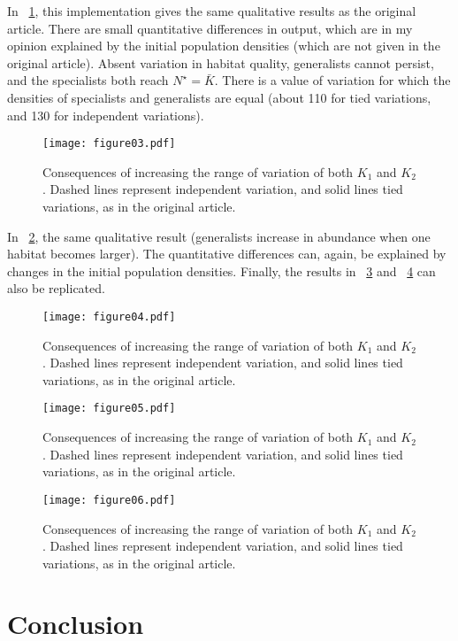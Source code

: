 \documentclass[10pt,a4paper,onecolumn]{article}
\renewcommand{\includegraphics}[2][]{\OldIncludegraphics[width=12cm, #1]{#2}}
\begin{document}
In ~\ref{fig:03}, this implementation gives the same qualitative results
as the original article. There are small quantitative differences in
output, which are in my opinion explained by the initial population
densities (which are not given in the original article). Absent
variation in habitat quality, generalists cannot persist, and the
specialists both reach \(N^\star = \bar K\). There is a value of
variation for which the densities of specialists and generalists are
equal (about 110 for tied variations, and 130 for independent
variations).

\begin{figure}
\centering
\texttt{[image: figure03.pdf]}
\caption{Consequences of increasing the range of variation of both
\(K_1\) and \(K_2\). Dashed lines represent independent variation, and
solid lines tied variations, as in the original article.}\label{fig:03}
\end{figure}

In ~\ref{fig:04}, the same qualitative result (generalists increase in
abundance when one habitat becomes larger). The quantitative differences
can, again, be explained by changes in the initial population densities.
Finally, the results in ~\ref{fig:05} and ~\ref{fig:06} can also be
replicated.

\begin{figure}
\centering
\texttt{[image: figure04.pdf]}
\caption{Consequences of increasing the range of variation of both
\(K_1\) and \(K_2\). Dashed lines represent independent variation, and
solid lines tied variations, as in the original article.}\label{fig:04}
\end{figure}

\begin{figure}
\centering
\texttt{[image: figure05.pdf]}
\caption{Consequences of increasing the range of variation of both
\(K_1\) and \(K_2\). Dashed lines represent independent variation, and
solid lines tied variations, as in the original article.}\label{fig:05}
\end{figure}

\begin{figure}
\centering
\texttt{[image: figure06.pdf]}
\caption{Consequences of increasing the range of variation of both
\(K_1\) and \(K_2\). Dashed lines represent independent variation, and
solid lines tied variations, as in the original article.}\label{fig:06}
\end{figure}

\section{Conclusion}\label{conclusion}
\end{document}
